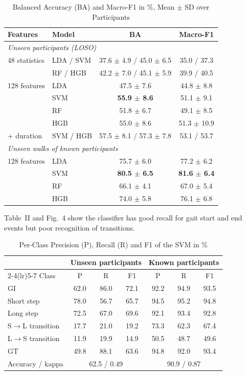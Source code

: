\documentclass[conference]{IEEEtran}
\begin{document}
\begin{table}[!t]
\caption{Balanced Accuracy (BA) and Macro-F1 in \%, Mean $\pm$ SD over Participants}
\label{tab:t1}
\centering
\setlength{\tabcolsep}{4pt}
\begin{tabular}{llcc}
\toprule
Features & Model & BA & Macro-F1 \\
\midrule
\multicolumn{4}{l}{\emph{Unseen participants (LOSO)}} \\
48 statistics & LDA / SVM & 37.6 $\pm$ 4.9 / 45.0 $\pm$ 6.5 & 35.0 / 37.3 \\
 & RF / HGB & 42.2 $\pm$ 7.0 / 45.1 $\pm$ 5.9 & 39.9 / 40.5 \\
128 features & LDA & 47.5 $\pm$ 7.6 & 44.8 $\pm$ 8.8 \\
 & SVM & \textbf{55.9 $\pm$ 8.6} & 51.1 $\pm$ 9.1 \\
 & RF & 51.8 $\pm$ 6.7 & 49.1 $\pm$ 8.5 \\
 & HGB & 55.0 $\pm$ 8.6 & 51.3 $\pm$ 10.9 \\
+ duration & SVM / HGB & 57.5 $\pm$ 8.1 / 57.3 $\pm$ 7.8 & 53.1 / 53.7 \\
\midrule
\multicolumn{4}{l}{\emph{Unseen walks of known participants}} \\
128 features & LDA & 75.7 $\pm$ 6.0 & 77.2 $\pm$ 6.2 \\
 & SVM & \textbf{80.5 $\pm$ 6.5} & \textbf{81.6 $\pm$ 6.4} \\
 & RF & 66.1 $\pm$ 4.1 & 67.0 $\pm$ 5.4 \\
 & HGB & 74.0 $\pm$ 5.8 & 76.1 $\pm$ 6.8 \\
\bottomrule
\end{tabular}
\end{table}

Table~II and Fig.~4 show the classifier has good recall for gait start and end events but poor recognition of transitions.

\begin{table}[!t]
\caption{Per-Class Precision (P), Recall (R) and F1 of the SVM in \%}
\label{tab:t2}
\centering
\setlength{\tabcolsep}{3.5pt}
\begin{tabular}{lcccccc}
\toprule
 & \multicolumn{3}{c}{Unseen participants} & \multicolumn{3}{c}{Known participants} \\
\cmidrule(lr){2-4}\cmidrule(lr){5-7}
Class & P & R & F1 & P & R & F1 \\
\midrule
GI & 62.0 & 86.0 & 72.1 & 92.2 & 94.9 & 93.5 \\
Short step & 78.0 & 56.7 & 65.7 & 94.5 & 95.2 & 94.8 \\
Long step & 72.5 & 67.0 & 69.6 & 92.1 & 93.4 & 92.8 \\
S$\to$L transition & 17.7 & 21.0 & 19.2 & 73.3 & 62.3 & 67.4 \\
L$\to$S transition & 11.9 & 19.9 & 14.9 & 50.5 & 48.7 & 49.6 \\
GT & 49.8 & 88.1 & 63.6 & 94.8 & 92.0 & 93.4 \\
\midrule
Accuracy / kappa & \multicolumn{3}{c}{62.5 / 0.49} & \multicolumn{3}{c}{90.9 / 0.87} \\
\bottomrule
\end{tabular}
\end{table}
\end{document}
